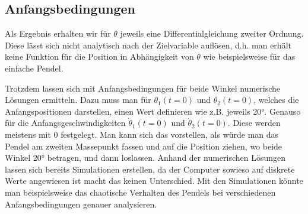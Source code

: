 \subsection{Anfangsbedingungen}
Als Ergebnis erhalten wir für \(\theta\) jeweils eine Differentialgleichung zweiter Ordnung.
Diese lässt sich nicht analytisch nach der Zielvariable auflösen,
d.h. man erhält keine Funktion für die Position in Abhängigkeit von \(\theta\) 
wie beispielsweise für das einfache Pendel.

Trotzdem lassen sich mit Anfangsbedingungen für beide Winkel numerische Lösungen ermitteln.
Dazu muss man für \(\theta_1(t=0)\) und \(\theta_2(t=0)\), welches die Anfangspositionen darstellen,
einen Wert definieren wie z.B. jeweils 20°. Genauso für die Anfangsgeschwindigkeiten \(\dot{\theta}_1(t=0)\)
und \(\dot{\theta}_2(t=0)\).
Diese werden meistens mit 0 festgelegt. Man kann sich das vorstellen, als würde man das Pendel
am zweiten Massepunkt fassen und auf die Position ziehen, wo beide Winkel 20° betragen, und dann loslassen.
Anhand der numerischen Lösungen lassen sich bereits Simulationen erstellen, da der Computer
sowieso auf diskrete Werte angewiesen ist macht das keinen Unterschied.
Mit den Simulationen könnte man beispielsweise das chaotische Verhalten des Pendels bei verschiedenen 
Anfangsbedingungen genauer analysieren.

